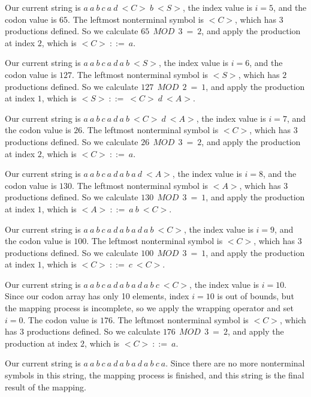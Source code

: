 Our current string is $a\:a\:b\:c\:a\:d\:{<}C{>}\:b\:{<}S{>}$, the index value is $i = 5$, and the codon value is $65$. The leftmost nonterminal symbol is ${<}C{>}$, which has $3$ productions defined. So we calculate $65\:\:MOD\:\:3\:=\:2$, and apply the production at index $2$, which is ${<}C{>}\:::=\:a$.

Our current string is $a\:a\:b\:c\:a\:d\:a\:b\:{<}S{>}$, the index value is $i = 6$, and the codon value is $127$. The leftmost nonterminal symbol is ${<}S{>}$, which has $2$ productions defined. So we calculate $127\:\:MOD\:\:2\:=\:1$, and apply the production at index $1$, which is ${<}S{>}\:::=\:{<}C{>}\:d\:{<}A{>}$.

Our current string is $a\:a\:b\:c\:a\:d\:a\:b\:{<}C{>}\:d\:{<}A{>}$, the index value is $i = 7$, and the codon value is $26$. The leftmost nonterminal symbol is ${<}C{>}$, which has $3$ productions defined. So we calculate $26\:\:MOD\:\:3\:=\:2$, and apply the production at index $2$, which is ${<}C{>}\:::=\:a$.

Our current string is $a\:a\:b\:c\:a\:d\:a\:b\:a\:d\:{<}A{>}$, the index value is $i = 8$, and the codon value is $130$. The leftmost nonterminal symbol is ${<}A{>}$, which has $3$ productions defined. So we calculate $130\:\:MOD\:\:3\:=\:1$, and apply the production at index $1$, which is ${<}A{>}\:::=\:a\:b\:{<}C{>}$.

Our current string is $a\:a\:b\:c\:a\:d\:a\:b\:a\:d\:a\:b\:{<}C{>}$, the index value is $i = 9$, and the codon value is $100$. The leftmost nonterminal symbol is ${<}C{>}$, which has $3$ productions defined. So we calculate $100\:\:MOD\:\:3\:=\:1$, and apply the production at index $1$, which is ${<}C{>}\:::=\:c\:{<}C{>}$.

Our current string is $a\:a\:b\:c\:a\:d\:a\:b\:a\:d\:a\:b\:c\:{<}C{>}$, the index value is $i = 10$. Since our codon array has only 10 elements, index $i = 10$ is out of bounds, but the mapping process is incomplete, so we apply the wrapping operator and set $i = 0$. The codon value is $176$. The leftmost nonterminal symbol is ${<}C{>}$, which has $3$ productions defined. So we calculate $176\:\:MOD\:\:3\:=\:2$, and apply the production at index $2$, which is ${<}C{>}\:::=\:a$.

Our current string is $a\:a\:b\:c\:a\:d\:a\:b\:a\:d\:a\:b\:c\:a$. Since there are no more nonterminal symbols in this string, the mapping process is finished, and this string is the final result of the mapping.